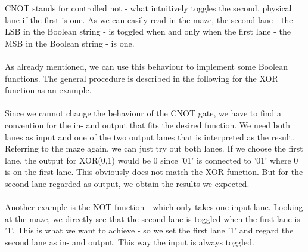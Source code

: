 \documentclass[oneside]{thesisclass}
\begin{document}
CNOT stands for controlled not - what intuitively toggles the second, physical lane if the first is one.
As we can easily read in the maze, the second lane - the LSB in the Boolean string - is toggled when and only when the first lane - the MSB in the Boolean string - is one.\\
\\As already mentioned, we can use this behaviour to implement some Boolean functions.
The general procedure is described in the following for the XOR function as an example.\\
\\Since we cannot change the behaviour of the CNOT gate, we have to find a convention for the in- and output that fits the desired function.
We need both lanes as input and one of the two output lanes that is interpreted as the result.
Referring to the maze again, we can just try out both lanes.
If we choose the first lane, the output for XOR(0,1) would be 0 since '01' is connected to '01' where 0 is on the first lane.
This obviously does not match the XOR function.
But for the second lane regarded as output, we obtain the results we expected.\\
\\Another example is the NOT function - which only takes one input lane.
Looking at the maze, we directly see that the second lane is toggled when the first lane is '1'.
This is what we want to achieve - so we set the first lane '1' and regard the second lane as in- and output.
This way the input is always toggled.\\
\end{document}
